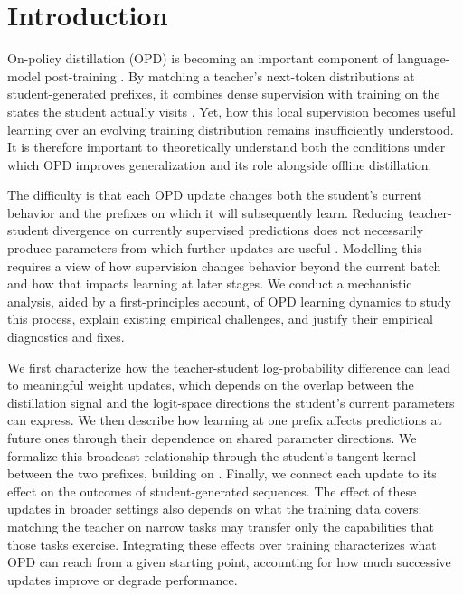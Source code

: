 
\section{Introduction}
\label{sec:intro}
On-policy distillation (OPD) is becoming an important component of language-model post-training \citep{tinker_opd_2025,opd_survey_2026}. By matching a teacher’s next-token distributions at student-generated prefixes, it combines dense supervision with training on the states the student actually visits \citep{gu2023minillm,agarwal2024onpolicydistillation}. Yet, how this local supervision becomes useful learning over an evolving training distribution remains insufficiently understood. It is therefore important to theoretically understand both the conditions under which OPD improves generalization and its role alongside offline distillation.

The difficulty is that each OPD update changes both the student’s current behavior and the prefixes on which it will subsequently learn. Reducing teacher-student divergence on currently supervised predictions does not necessarily produce parameters from which further updates are useful \citep{rethinking_opd_2026, armandpour2026unmaskingonpolicydistillationhelps}. Modelling this requires a view of how supervision changes behavior beyond the current batch and how that impacts learning at later stages. We conduct a mechanistic analysis, aided by a first-principles account, of OPD learning dynamics to study this process, explain existing empirical challenges, and justify their empirical diagnostics and fixes.

We first characterize how the teacher-student log-probability difference can lead to meaningful weight updates, which depends on the overlap between the distillation signal and the logit-space directions the student’s current parameters can express. We then describe how learning at one prefix affects predictions at future ones through their dependence on shared parameter directions. We formalize this broadcast relationship through the student’s tangent kernel between the two prefixes, building on \citet{ren2025learning, malladi2023kernelbasedviewlanguagemodel}. Finally, we connect each update to its effect on the outcomes of student-generated sequences. The effect of these updates in broader settings also depends on what the training data covers: matching the teacher on narrow tasks may transfer only the capabilities that those tasks exercise. Integrating these effects over training characterizes what OPD can reach from a given starting point, accounting for how much successive updates improve or degrade performance.


